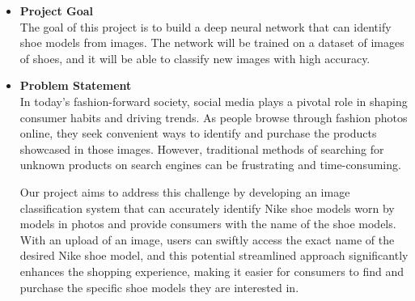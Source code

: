 \documentclass{article}
\begin{document}
        \begin{itemize}
	   \item[] \textbf{Project Goal} \\
		The goal of this project is to build a deep neural network that can identify shoe models from images. The network will be trained on a dataset of images of shoes, and it will be able to classify new images with high accuracy. 
            \item[] \textbf{Problem Statement} \\
		In today's fashion-forward society, social media plays a pivotal role in shaping consumer habits and driving trends. As people browse through fashion photos online, they seek convenient ways to identify and purchase the products showcased in those images. However, traditional methods of searching for unknown products on search engines can be frustrating and time-consuming. 

  

Our project aims to address this challenge by developing an image classification system that can accurately identify Nike shoe models worn by models in photos and provide consumers with the name of the shoe models. With an upload of an image, users can swiftly access the exact name of the desired Nike shoe model, and this potential streamlined approach significantly enhances the shopping experience, making it easier for consumers to find and purchase the specific shoe models they are interested in. 

  


\end{itemize}
\end{document}
